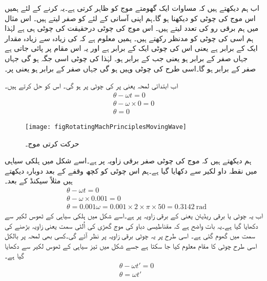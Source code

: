 اب ہم دیکھتے ہیں کہ مساوات  ایک گھومتے موج کو ظاہر کرتی ہے۔یہ کرنے کے لئے ہمیں اس موج کی چوٹی کو دیکھنا ہو گا۔ہم اپنی آسانی کے لئے   کو صفر لیتے ہیں۔ اس مثال میں ہم برقی رو کی تعدد   لیتے ہیں۔ اس موج کی چوٹی درحقیقت  کی چوٹی ہی ہے لہٰذا ہم اسی کی چوٹی کو مدنظر رکھتے ہیں۔ ہمیں معلوم ہے کہ  کی زیادہ سے زیادہ مقدار ایک کے برابر ہے یعنی اس کی چوٹی ایک کے برابر ہے اور یہ اس مقام پر پائی جاتی ہے جہاں  صفر کے برابر ہو یعنی جب  کے برابر ہو۔ لہٰذا  کی چوٹی اسی جگہ ہو گی جہاں  صفر کے برابر ہو گا۔اسی طرح  کی چوٹی وہیں ہو گی جہاں  صفر کے برابر ہو یعنی  پر۔

اب ابتدائی لمحہ  یعنی  پر  کی چوٹی  پر ہو گی۔ اس کو حل کرتے ہیں۔
\begin{align*}
\theta-\omega t =0\\
\theta -\omega \times 0=0\\
\theta =0
\end{align*}
%
\begin{figure}
\centering
\texttt{[image: figRotatingMachPrinciplesMovingWave]}
\caption{حرکت کرتی موج۔}
\label{شکل_گھومتے_مشین_حرکت_کرتی_موج}
\end{figure}
ہم دیکھتے ہیں کہ موج کی چوٹی صفر برقی زاویہ پر ہے۔اسے شکل  میں ہلکی سیاہی میں نقطہ داو لکیر سے دکھایا گیا ہے۔ہم اس چوٹی کو کچھ وقفے کے بعد دوبارہ دیکھتے ہیں مثلاً  سیکنڈ کے بعد۔
\begin{align*}
&\theta-\omega t =0\\
&\theta -\omega \times 0.001=0\\
&\theta =0.001 \omega =0.001 \times 2 \times \pi \times 50=\SI{0.3142}{\radian} 
\end{align*}
اب یہ چوٹی  یا  برقی ریڈیئن یعنی  کے برقی زاویہ پر ہے۔اسے  شکل میں ہلکی سیاہی کے ٹھوس لکیر سے دکھایا گیا ہے۔یہ بات واضح ہے کہ مقناطیسی دباو کی موج گھڑی کی اُلٹی سمت یعنی زاویہ بڑھنے کی سمت میں گھوم گئی ہے۔ اسی طرح   پر یہ چوٹی  برقی زاویہ پر نظر آئے گی۔کسی بھی لمحہ  پر بالکل اسی طرح چوٹی کا مقام معلوم کیا جا سکتا ہے جسے شکل میں تیز سیاہی کے ٹھوس لکیر سے دکھایا گیا ہے۔
\begin{align*}
&\theta-\omega t' =0\\
&\theta =\omega t'
\end{align*}
